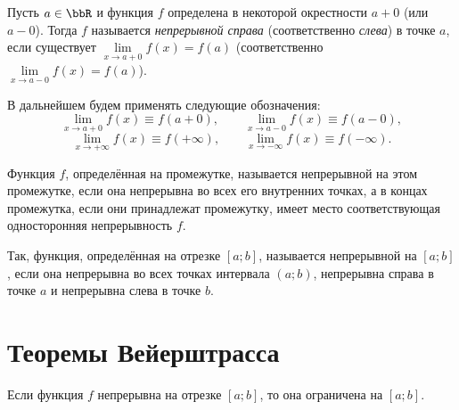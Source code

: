 \begin{defn} \label{df3:5}
Пусть $a \in \bbR$ и функция $f$ определена в некоторой окрестности $a + 0$ (или $a - 0$). Тогда $f$ называется \textit{непрерывной справа} (соответственно \textit{слева}) в точке $a$, если существует $\lim\limits_{x \to a + 0} f(x) = f(a)$ (соответственно $\lim\limits_{x \to a - 0} f(x) = f(a)$).
\end{defn}

\noindent В дальнейшем будем применять следующие обозначения:
$$
\lim_{x \to a + 0} f(x) \equiv f(a + 0), \qquad \lim_{x \to a - 0} f(x) \equiv f(a - 0),
$$
$$
\lim_{x \to +\infty} f(x) \equiv f(+\infty), \qquad \lim_{x \to -\infty} f(x) \equiv f(-\infty).
$$


\begin{defn} \label{df3:10}
Функция $f$, определённая на промежутке, называется непрерывной на этом промежутке, если она непрерывна во всех его внутренних точках, а в концах промежутка, если они принадлежат промежутку, имеет место соответствующая односторонняя непрерывность $f$.

Так, функция, определённая на отрезке $[a; b]$, называется непрерывной на $[a; b]$, если она непрерывна во всех точках интервала $(a; b)$, непрерывна справа в точке $a$ и непрерывна слева в точке $b$.
\end{defn}

\section{Теоремы Вейерштрасса}


\begin{thm} \label{th3:11}
Если функция $f$ непрерывна на отрезке $[a; b]$, то она ограничена на $[a; b]$.
\end{thm}

